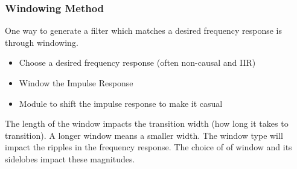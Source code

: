 \documentclass{article}
\begin{document}
\subsubsection{Windowing Method}
One way to generate a filter which matches a desired frequency response is through windowing.
\begin{itemize}
  \item Choose a desired frequency response (often non-causal and IIR)
  \item Window the Impulse Response
  \item Module to shift the impulse response to make it casual
\end{itemize}
The length of the window impacts the transition width (how long it takes to transition). A longer window means a smaller width. The window type will impact
the ripples in the frequency response. The choice of of window and its sidelobes impact these magnitudes.
\end{document}

